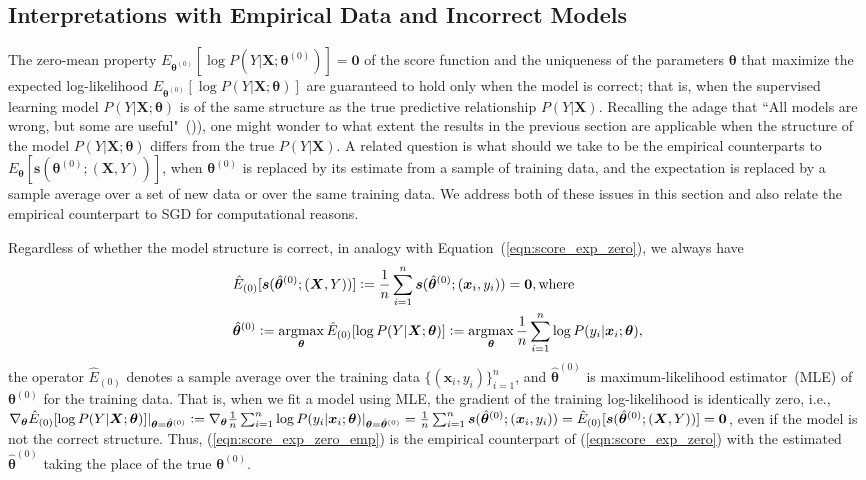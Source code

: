 \documentclass[twoside,11pt]{article}
\DeclareMathOperator*{\argmax}{argmax} %
\begin{document}
\subsection{Interpretations with Empirical Data and Incorrect Models}
\label{ss:sgd_score}
The zero-mean property $E_{\bm{\theta}^{(0)}}[\log{P(Y|\bm{X}; \bm{\theta}^{(0)})}] = \textbf{0}$ of the score function and the uniqueness of the parameters $\bm{\theta}$ that maximize the expected log-likelihood $E_{\bm{\theta}^{(0)}}[\log P(Y|\bm{X}; \bm{\theta})]$ are guaranteed to hold only when the model is correct; that is, when the supervised learning model $P(Y|\bm{X};\bm{\theta})$ is of the same structure as the true predictive relationship $P(Y|\bm{X})$. Recalling the adage that ``All models are wrong, but some are useful"~(\cite{box1976science})), one might wonder to what extent the results in the previous section are applicable when the structure of the model $P(Y|\bm{X};\bm{\theta})$ differs from the true $P(Y|\bm{X})$. A related question is what should we take to be the empirical counterparts to $E_{\bm{\theta}}[\bm{s}(\bm{\theta}^{(0)};(\bm{X},Y) )]$, when $\bm{\theta}^{(0)}$ is replaced by its estimate from a sample of training data, and the expectation is replaced by a sample average over a set of new data or over the same training data. We address both of these issues in this section and also relate the empirical counterpart to SGD for computational reasons. 

Regardless of whether the model structure is correct, in analogy with Equation~(\ref{eqn:score_exp_zero}), we always have
\begin{align}
\begin{aligned}
&\hat{E}_{(0)}[\bm{s}(\hat{\bm{\theta}}^{(0)};(\bm{X}, Y))] \vcentcolon=\frac{1}{n}\sum_{i=1}^{n}\bm{s}(\hat{\bm{\theta}}^{(0)};(\bm{x}_i, y_i))=\bm{0}, \text{where} \\
&\hat{\bm{\theta}}^{(0)} \vcentcolon =  \argmax_{\bm{\theta}}\hat{E}_{(0)}[\log{P(Y|\bm{X}; \bm{\theta})}] \vcentcolon= \argmax_{\bm{\theta}}\frac{1}{n}\sum_{i=1}^n \log{P(y_i|\bm{x}_i;\bm{\theta})},
\end{aligned}
\label{eqn:score_exp_zero_emp}
\end{align}   
the operator $\hat{E}_{(0)}$ denotes a sample average over the training data $\{(\bm{x}_i, y_i)\}_{i=1}^n$, and $\hat{\bm{\theta}}^{(0)}$ is maximum-likelihood estimator~(MLE) of $\bm{\theta}^{(0)}$ for the training data. That is, when we fit a model using MLE, the gradient of the training log-likelihood is identically zero, i.e., $\nabla_{\bm{\theta}}\hat{E}_{(0)}[\log{P(Y|\bm{X}; {\bm{\theta}})}]|_{\bm{\theta}=\hat{\bm{\theta}}^{(0)}} \vcentcolon=\nabla_{\bm{\theta}}\frac{1}{n}\sum_{i=1}^n \log{P(y_i|\bm{x}_i;{\bm{\theta}})|_{\bm{\theta}=\hat{\bm{\theta}}^{(0)}}}=\frac{1}{n}\sum_{i=1}^n\bm{s}(\hat{\bm{\theta}}^{(0)};(\bm{x}_i, y_i)) = \hat{E}_{(0)}[\bm{s}(\hat{\bm{\theta}}^{(0)};(\bm{X}, Y))]=\bm{0}$, even if the model is not the correct structure. Thus, (\ref{eqn:score_exp_zero_emp}) is the empirical counterpart of (\ref{eqn:score_exp_zero}) with the estimated $\hat{\bm{\theta}}^{(0)}$ taking the place of the true $\bm{\theta}^{(0)}$. 
\end{document}
